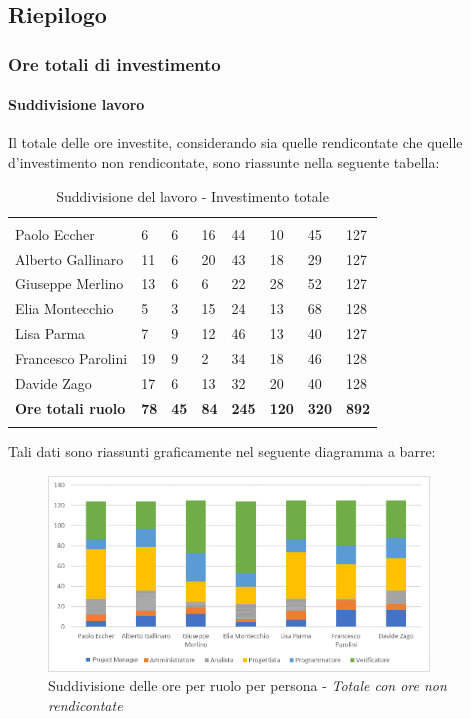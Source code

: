 	\subsection{Riepilogo}
		\subsubsection{Ore totali di investimento}
			\paragraph{Suddivisione lavoro} \Spazio
			Il totale delle ore investite, considerando sia quelle rendicontate che quelle d'investimento non rendicontate, sono riassunte nella seguente tabella:
					\begin{table}[H]
			\centering
			\begin{tabular}{|C{4cm}|C{0.8cm}|C{0.8cm}|C{0.8cm}|C{0.8cm}|C{0.8cm}|C{0.8cm}|C{3cm}|}
				 & & &&&&&\\
				Paolo Eccher 		& 6  & 6 & 16 & 44 & 10 & 45 & 127 \\
				\hline
				Alberto Gallinaro 	& 11 & 6 & 20 & 43 & 18 & 29 & 127 \\
				\hline
				Giuseppe Merlino 	& 13 & 6 & 6  & 22 & 28 & 52 & 127 \\
				\hline
				Elia Montecchio 	& 5 & 3 & 15 & 24 & 13 & 68 & 128 \\
				\hline
				Lisa Parma 			& 7 & 9 & 12 & 46 & 13 & 40 & 127 \\
				\hline
				Francesco Parolini 	& 19 & 9 & 2 & 34 & 18 & 46 & 128 \\
				\hline
				Davide Zago 		& 17 & 6 & 13 & 32 & 20 & 40 & 128 \\
				\hline
				\textbf{Ore totali ruolo}  & \textbf{78} & \textbf{45} & \textbf{84} & \textbf{245} & \textbf{120} & \textbf{320} & \textbf{892} \\
			\end{tabular}
			\caption{Suddivisione del lavoro - Investimento totale }
			\end{table}
		
			Tali dati sono riassunti graficamente nel seguente diagramma a barre:
			
			\begin{figure}[H] 
				\centering 
				\includegraphics[width=0.9\textwidth]{images/BarreTotale.png} 
				\caption{Suddivisione delle ore per ruolo per persona - \textit{Totale con ore non rendicontate}}
				\label{BarreTotale}
			\end{figure}

